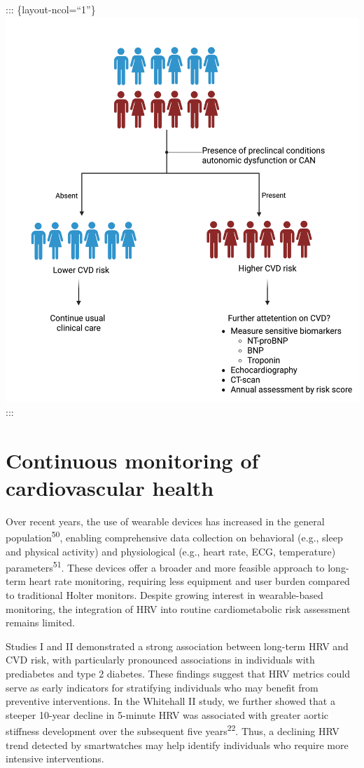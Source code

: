 \documentclass[
  a4paper,
  headsepline=true,
  open=any]{scrbook}
\begin{document}
::: \{layout-ncol=``1''\}
\includegraphics{images/strafication_tree_of_CAN.png} :::

\hypertarget{continuous-monitoring-of-cardiovascular-health}{%
\section{Continuous monitoring of cardiovascular
health}\label{continuous-monitoring-of-cardiovascular-health}}

Over recent years, the use of wearable devices has increased in the
general population\textsuperscript{50}, enabling comprehensive data
collection on behavioral (e.g., sleep and physical activity) and
physiological (e.g., heart rate, ECG, temperature)
parameters\textsuperscript{51}. These devices offer a broader and more
feasible approach to long-term heart rate monitoring, requiring less
equipment and user burden compared to traditional Holter monitors.
Despite growing interest in wearable-based monitoring, the integration
of HRV into routine cardiometabolic risk assessment remains limited.

Studies I and II demonstrated a strong association between long-term HRV
and CVD risk, with particularly pronounced associations in individuals
with prediabetes and type 2 diabetes. These findings suggest that HRV
metrics could serve as early indicators for stratifying individuals who
may benefit from preventive interventions. In the Whitehall II study, we
further showed that a steeper 10-year decline in 5-minute HRV was
associated with greater aortic stiffness development over the subsequent
five years\textsuperscript{22}. Thus, a declining HRV trend detected by
smartwatches may help identify individuals who require more intensive
interventions.
\end{document}

